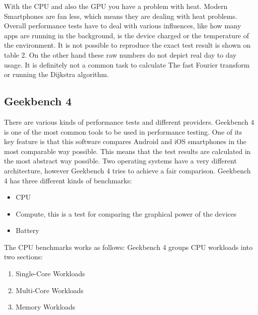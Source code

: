 \documentclass[conference, 11pt]{IEEEtran}
\begin{document}
With the CPU and also the GPU you have a problem with heat. Modern Smartphones are fan less, which means they are dealing with heat problems. Overall performance tests have to deal with various influences, like how many apps are running in the background, is the device charged or the temperature of the environment. It is not possible to reproduce the exact test result is shown on table 2. 
On the other hand these raw numbers do not depict real day to day usage. It is definitely not a common task to calculate The fast Fourier transform or running the Dijkstra algorithm.

\subsection{Geekbench 4}
There are various kinds of performance tests and different providers. Geekbench 4 is one of the most common tools to be used in performance testing. One of its key feature is that this software compares Android and iOS smartphones in the most comparable way possible. This means that the test results are calculated in the most abstract way possible. Two operating systems have a very different architecture, however Geekbench 4 tries to achieve a fair comparison.  
Geekbench 4 has three different kinds of benchmarks:
\begin{itemize}
\item CPU
\item Compute, this is a test for comparing the graphical power of the devices 
\item Battery
\end{itemize}
The CPU benchmarks works as follows: \newline
Geekbench 4 groups CPU workloads into two sections:
\begin{enumerate}
\item Single-Core Workloads
\item Multi-Core Workloads
\item Memory Workloads
\end{enumerate}
\end{document}
